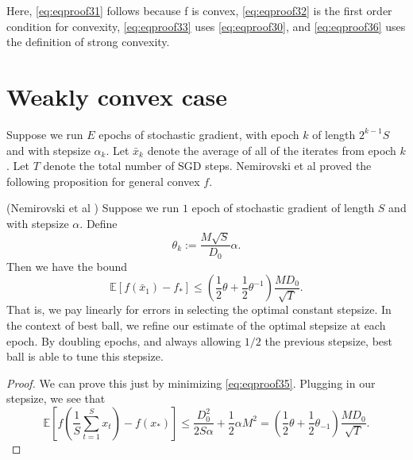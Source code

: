 Here, \eqref{eq:eqproof31} follows because f is convex, \eqref{eq:eqproof32} is the first order condition for convexity, \eqref{eq:eqproof33} uses \eqref{eq:eqproof30}, and \eqref{eq:eqproof36} uses the definition of strong convexity.

\section{Weakly convex case}
Suppose we run $E$ epochs of stochastic gradient, with epoch $k$ of length $2^{k-1}S$ and with stepsize $\alpha_k$. Let $\bar{x}_k$ denote the average of all of the iterates from epoch $k$. Let $T$ denote the total number of SGD steps. Nemirovski et al proved the following proposition for general convex $f$.

\begin{proposition} (Nemirovski et al \cite{Nemirovski2009}) Suppose we run $1$ epoch of stochastic gradient of length $S$ and with stepsize $\alpha$. Define
\begin{equation}
\theta_k:=\frac{M\sqrt{S}}{D_0} \alpha.
\end{equation}
Then we have the bound 
\begin{equation}
\mathbb{E}[f(\bar{x}_1)-f_*] \leq \left( \frac{1}{2}\theta +\frac{1}{2}\theta^{-1} \right) \frac{MD_0}{\sqrt{T}}.
\end{equation}
That is, we pay linearly for errors in selecting the optimal constant stepsize. In the context of best ball, we refine our estimate of the optimal stepsize at each epoch. By doubling epochs, and always allowing $1/2$ the previous stepsize, best ball is able to tune this stepsize.
\end{proposition}
\begin{proof}
We can prove this just by minimizing \eqref{eq:eqproof35}. Plugging in our stepsize, we see that
\begin{equation}
\mathbb{E}[f(\frac{1}{S} \sum_{t=1}^S x_t)-f(x_*)] \leq \frac{D_0^2}{2S\alpha}+\frac{1}{2}\alpha M^2=\left( \frac{1}{2}\theta +\frac{1}{2}\theta_{-1} \right) \frac{MD_0}{\sqrt{T}}.
\end{equation}
\end{proof}



